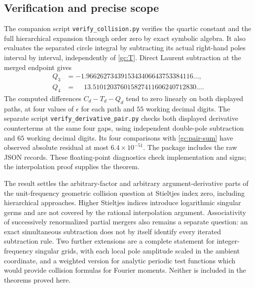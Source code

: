 \subsection{Verification and precise scope}
The companion script \texttt{verify\_collision.py} verifies the quartic
constant and the full hierarchical expansion through order zero by exact
symbolic algebra.  It also evaluates the separated circle integral by
subtracting its actual right-hand poles interval by interval, independently
of \eqref{gc:T}.  Direct Laurent subtraction at
the merged endpoint gives
\begin{align*}
 Q_3&=-1.9662627343915343406643753384116\ldots,\\
 Q_4&=\phantom{-}13.510120376015827411606240712830\ldots.
\end{align*}
The computed differences $C_d-T_d-Q_d$ tend to zero linearly on both
displayed paths, at four values of $\epsilon$ for each path and $55$
working decimal digits.  The separate script
\texttt{verify\_derivative\_pair.py} checks both displayed derivative
counterterms at the same four gaps, using independent double-pole
subtraction and $65$ working decimal digits.  Its four comparisons with
\eqref{gc:pair-sum} have observed absolute residual at most
$6.4\times10^{-51}$.  The package includes the raw JSON records.
These floating-point diagnostics check implementation and signs; the
interpolation proof supplies the theorem.

The result settles the arbitrary-factor and arbitrary argument-derivative
parts of the unit-frequency geometric collision question at Stieltjes index zero,
including hierarchical approaches.  Higher Stieltjes indices introduce
logarithmic singular germs and are not covered by the rational
interpolation argument.  Associativity of successively renormalized
partial mergers also remains a separate question: an exact simultaneous
subtraction does not by itself identify every iterated subtraction rule.
Two further extensions are a complete statement for integer-frequency
singular grids, with each local pole amplitude scaled in the ambient
coordinate, and a weighted version for analytic periodic test functions
which would provide collision formulas for Fourier moments.  Neither is
included in the theorems proved here.
